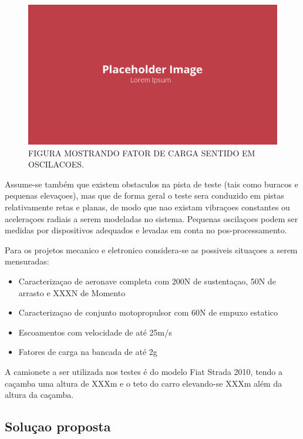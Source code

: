\begin{figure}[!ht]
    \centering
    \includegraphics[width=.8\linewidth]{figuras/placeholder.png}
    \caption{FIGURA MOSTRANDO FATOR DE CARGA SENTIDO EM OSCILACOES\cite{autor}.}
    \label{fig:placeholder}
\end{figure}

Assume-se também que existem obstaculos na pista de teste (tais como buracos e pequenas elevaçoes), mas que de forma geral o teste sera conduzido em pistas relativamente retas e planas, de modo que nao existam vibraçoes constantes ou aceleraçoes radiais a serem modeladas no sistema. Pequenas oscilaçoes podem ser medidas por dispositivos adequados e levadas em conta no pos-processamento.

Para os projetos mecanico e eletronico considera-se as possiveis situaçoes a serem mensuradas:


\begin{itemize}
    \item Caracterizaçao de aeronave completa com 200N de sustentaçao, 50N de arrasto e XXXN de Momento
    \item Caracterizaçao de conjunto motopropulsor com 60N de empuxo estatico
    \item Escoamentos com velocidade de até 25m/s
    \item Fatores de carga na bancada de até 2g
\end{itemize}

A camionete a ser utilizada nos testes é do modelo Fiat Strada 2010, tendo a caçamba uma altura de XXXm e o teto do carro elevando-se XXXm além da altura da caçamba.

\subsection{Soluçao proposta}

